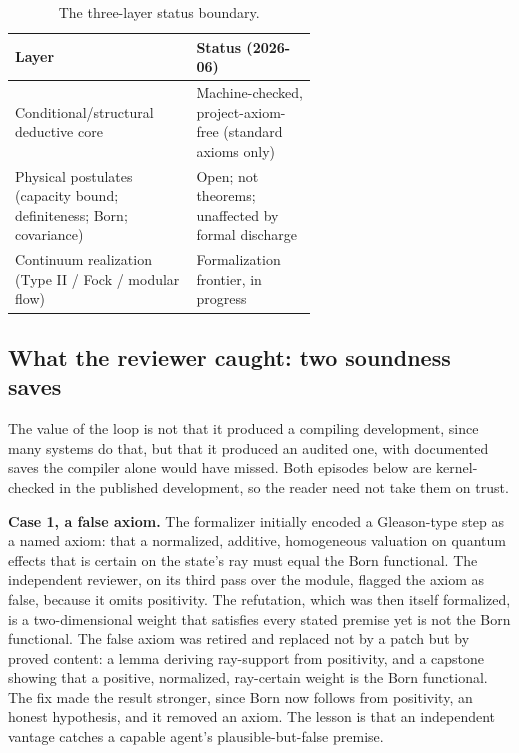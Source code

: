 \documentclass[11pt]{article}
\begin{document}
\begin{table}[ht]
\centering
\caption{The three-layer status boundary.}
\begin{tabularx}{\linewidth}{@{}>{\raggedright\arraybackslash}p{0.60\linewidth}Y@{}}
\toprule
\textbf{Layer} & \textbf{Status (2026-06)} \\
\midrule
Conditional/structural deductive core & Machine-checked, project-axiom-free (standard axioms only) \\
Physical postulates (capacity bound; definiteness; Born; covariance) & Open; not theorems; unaffected by formal discharge \\
Continuum realization (Type II / Fock / modular flow) & Formalization frontier, in progress \\
\bottomrule
\end{tabularx}
\end{table}

\subsection{What the reviewer caught: two soundness saves}

The value of the loop is not that it produced a compiling development, since many systems do that,
but that it produced an audited one, with documented saves the compiler alone would have missed.
Both episodes below are kernel-checked in the published development, so the reader need not take
them on trust.

\textbf{Case 1, a false axiom.} The formalizer initially encoded a Gleason-type step as a named axiom:
that a normalized, additive, homogeneous valuation on quantum effects that is certain on the state's
ray must equal the Born functional. The independent reviewer, on its third pass over the module,
flagged the axiom as false, because it omits positivity. The refutation, which was then itself
formalized, is a two-dimensional weight that satisfies every stated premise yet is not the Born
functional. The false axiom was retired and replaced not by a patch but by proved content: a lemma
deriving ray-support from positivity, and a capstone showing that a positive, normalized,
ray-certain weight is the Born functional. The fix made the result stronger, since Born now follows
from positivity, an honest hypothesis, and it removed an axiom. The lesson is that an independent
vantage catches a capable agent's plausible-but-false premise.
\end{document}
